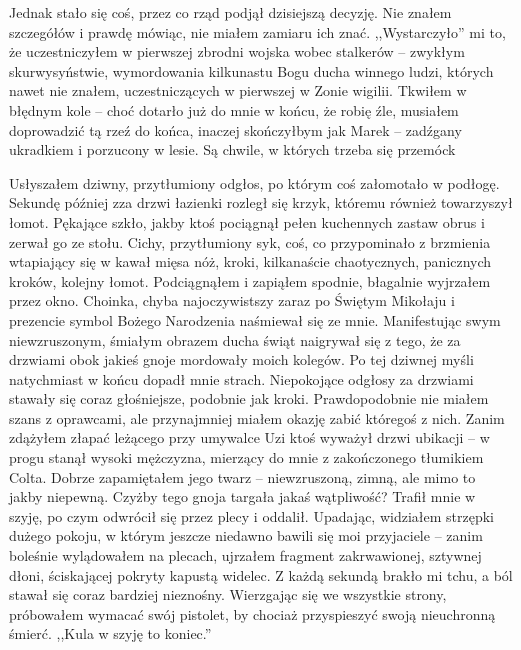 \documentclass[../MAIN.tex]{subfiles}
\begin{document}
Jednak stało się coś, przez co rząd podjął dzisiejszą decyzję. Nie znałem szczegółów i prawdę mówiąc, nie miałem zamiaru ich znać. ,,Wystarczyło'' mi to, że uczestniczyłem w pierwszej zbrodni wojska wobec stalkerów -- zwykłym skurwysyństwie, wymordowania kilkunastu Bogu ducha winnego ludzi, których nawet nie znałem, uczestniczących w pierwszej w Zonie wigilii.
Tkwiłem w błędnym kole -- choć dotarło już do mnie w końcu, że robię źle, musiałem doprowadzić tą rzeź do końca, inaczej skończyłbym jak Marek -- zadźgany ukradkiem i porzucony w lesie.
Są chwile, w których trzeba się przemóc\3k


Usłyszałem dziwny, przytłumiony odgłos, po którym coś załomotało w podłogę. Sekundę później zza drzwi łazienki rozległ się krzyk, któremu również towarzyszył łomot. Pękające szkło, jakby ktoś pociągnął pełen kuchennych zastaw obrus i zerwał go ze stołu. Cichy, przytłumiony syk, coś, co przypominało z brzmienia wtapiający się w kawał mięsa nóż, kroki, kilkanaście chaotycznych, panicznych kroków, kolejny łomot.
Podciągnąłem i zapiąłem spodnie, błagalnie wyjrzałem przez okno.
Choinka, chyba najoczywistszy zaraz po Świętym Mikołaju i prezencie symbol Bożego Narodzenia naśmiewał się ze mnie. Manifestując swym niewzruszonym, śmiałym obrazem ducha świąt naigrywał się z tego, że za drzwiami obok jakieś gnoje mordowały moich kolegów.
Po tej dziwnej myśli natychmiast w końcu dopadł mnie strach. Niepokojące odgłosy za drzwiami stawały się coraz głośniejsze, podobnie jak kroki. Prawdopodobnie nie miałem szans z oprawcami, ale przynajmniej miałem okazję zabić któregoś z nich.
Zanim zdążyłem złapać leżącego przy umywalce Uzi ktoś wyważył drzwi ubikacji -- w progu stanął wysoki mężczyzna, mierzący do mnie z zakończonego tłumikiem Colta. Dobrze zapamiętałem jego twarz -- niewzruszoną, zimną, ale mimo to jakby niepewną.
Czyżby tego gnoja targała jakaś wątpliwość?
Trafił mnie w szyję, po czym odwrócił się przez plecy i oddalił. Upadając, widziałem strzępki dużego pokoju, w którym jeszcze niedawno bawili się moi przyjaciele -- zanim boleśnie wylądowałem na plecach, ujrzałem fragment zakrwawionej, sztywnej dłoni, ściskającej pokryty kapustą widelec.
Z każdą sekundą brakło mi tchu, a ból stawał się coraz bardziej nieznośny. Wierzgając się we wszystkie strony, próbowałem wymacać swój pistolet, by chociaż przyspieszyć swoją nieuchronną śmierć.
,,Kula w szyję to koniec.''
\end{document}
